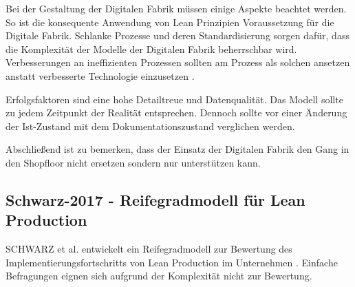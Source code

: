 Bei der Gestaltung der Digitalen Fabrik müssen einige Aspekte beachtet werden. So ist die konsequente Anwendung von Lean Prinzipien Voraussetzung für die Digitale Fabrik. Schlanke Prozesse und deren Standardisierung sorgen dafür, dass die Komplexität der Modelle der Digitalen Fabrik beherrschbar wird. 
Verbesserungen an ineffizienten Prozessen sollten am Prozess als solchen ansetzen anstatt verbesserte Technologie einzusetzen \cite{Liker2013}. 

Erfolgsfaktoren sind eine hohe Detailtreue und Datenqualität. Das Modell sollte zu jedem Zeitpunkt der Realität entsprechen. Dennoch sollte vor einer Änderung der Ist-Zustand mit dem Dokumentationszustand verglichen werden. 

Abschließend ist zu bemerken, dass der Einsatz der Digitalen Fabrik den Gang in den Shopfloor nicht ersetzen sondern nur unterstützen kann. 


\subsection*{Schwarz-2017 - Reifegradmodell für Lean Production}\label{sec:rgmodell}

SCHWARZ et al. entwickelt ein Reifegradmodell zur Bewertung des Implementierungsfortschritts von Lean Production im Unternehmen \cite{Schwarz2017}. Einfache Befragungen eignen sich aufgrund der Komplexität nicht zur Bewertung. 

